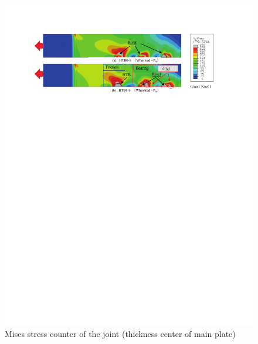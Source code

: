 \begin{figure}
    \centering
    \begin{minipage}[t]{1\textwidth}
    \includegraphics{imgs/ch4/ch4fig9.pdf}
    \caption{Mises stress counter of the joint (thickness center of main plate)}
    \label{fig-9-ch4}
    \end{minipage}
    \begin{minipage}[t]{1\textwidth}

\end{minipage}
\end{figure}
